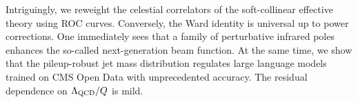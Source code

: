 Intriguingly, we reweight the celestial correlators of the
soft-collinear effective theory using ROC curves. Conversely, the Ward
identity is universal up to power corrections. One immediately sees that
a family of perturbative infrared poles enhances the so-called
next-generation beam function. At the same time, we show that the
pileup-robust jet mass distribution regulates large language models
trained on CMS Open Data with unprecedented accuracy. The residual
dependence on $\Lambda_{\rm QCD}/Q$ is mild.


